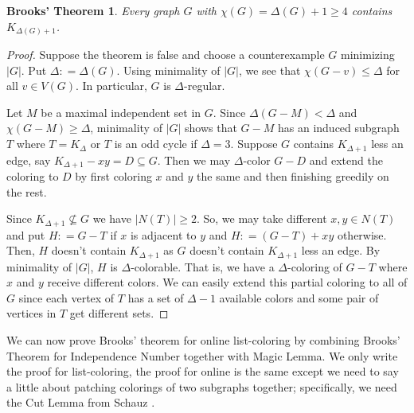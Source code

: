 \documentclass[12pt]{article}
\theoremstyle{plain}
\newtheorem*{BrooksTheorem}{Brooks' Theorem}
\theoremstyle{definition}
\theoremstyle{remark}
\newcommand{\card}[1]{\left|#1\right|}
\newcommand{\DefinedAs}{\mathrel{\mathop:}=}
\begin{document}
\begin{BrooksTheorem}
	Every graph $G$ with $\chi(G) = \Delta(G) + 1 \geq 4$ contains
	$K_{\Delta(G) + 1}$.
\end{BrooksTheorem}
\begin{proof}
	Suppose the theorem is false and choose a counterexample $G$ minimizing
	$\card{G}$.  Put $\Delta \DefinedAs \Delta(G)$. Using minimality of $\card{G}$,
	we see that $\chi(G - v) \le \Delta$ for all $v \in
	V(G)$. In particular, $G$ is $\Delta$-regular.
	
	Let $M$ be a maximal independent set in $G$.  Since $\Delta(G-M) < \Delta$ and $\chi(G-M) \ge \Delta$, minimality of $|G|$ shows that $G-M$ has an induced subgraph $T$ where $T = K_\Delta$ or $T$ is an odd cycle if $\Delta=3$.   Suppose $G$ contains $K_{\Delta + 1}$ less an edge, say $K_{\Delta + 1} - xy = D \subseteq G$. Then we may $\Delta$-color $G-D$ and extend the coloring to $D$ by first coloring $x$ and $y$ the same and then finishing greedily on the rest.
	
	Since $K_{\Delta + 1} \not \subseteq G$ we have $\card{N(T)} \geq 2$. So, we may take different $x, y \in N(T)$ and put $H \DefinedAs G - T$ if $x$ is adjacent to $y$ and $H \DefinedAs (G-T) + xy$ otherwise.  Then, $H$ doesn't contain $K_{\Delta + 1}$ as $G$ doesn't contain $K_{\Delta + 1}$ less an edge. By minimality of $\card{G}$, $H$ is $\Delta$-colorable. That is, we have a $\Delta$-coloring of $G - T$ where $x$ and $y$ receive different colors.  We can easily extend this partial coloring to all of $G$ since each vertex of $T$ has a set of $\Delta - 1$ available
	colors and some pair of vertices in $T$ get different sets.  
\end{proof}

We can now prove Brooks' theorem for online list-coloring by combining Brooks' Theorem for Independence Number together with Magic Lemma.  We only write the proof for list-coloring, the proof for online is the same except we need to say a little about patching colorings of two subgraphs together; specifically, we need the Cut Lemma from Schauz \cite{schauz2009mr}.
\end{document}
